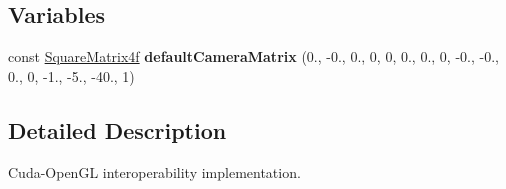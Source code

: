 \subsection*{Variables}
\begin{DoxyCompactItemize}
\item 
const \hyperlink{class_square_matrix4}{Square\+Matrix4f} {\bfseries default\+Camera\+Matrix} (0., -\/0., 0., 0, 0, 0., 0., 0, -\/0., -\/0., 0., 0, -\/1., -\/5., -\/40., 1)\hypertarget{group__api__graphics_gafdb8db8b7af78698e4ce48bf1ec7af05}{}\label{group__api__graphics_gafdb8db8b7af78698e4ce48bf1ec7af05}

\end{DoxyCompactItemize}


\subsection{Detailed Description}
Cuda-\/\+Open\+GL interoperability implementation. 

